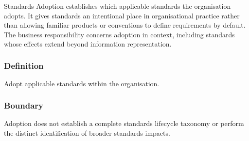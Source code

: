 Standards Adoption establishes which applicable standards the organisation adopts. It gives standards an intentional place in organisational practice rather than allowing familiar products or conventions to define requirements by default. The business responsibility concerns adoption in context, including standards whose effects extend beyond information representation.

\subsubsection*{Definition}

Adopt applicable standards within the organisation.

\subsubsection*{Boundary}

Adoption does not establish a complete standards lifecycle taxonomy or perform the distinct identification of broader standards impacts.

